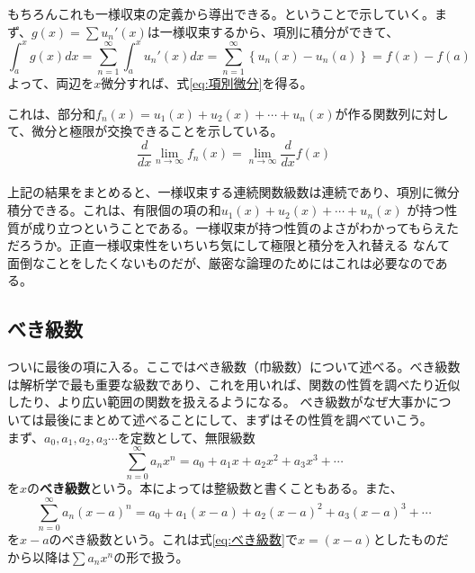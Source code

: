 \documentclass[a4j,dvipdfmx]{jsarticle}
\begin{document}
                もちろんこれも一様収束の定義から導出できる。ということで示していく。まず、$g(x)=\sum u_n'(x)$は一様収束するから、項別に積分ができて、
                \begin{equation*}
                    \int_{a}^{x}g(x)dx = \sum_{n=1}^{\infty}\int_{a}^{x}u_n'(x)dx = \sum_{n=1}^{\infty}\left\{u_n(x)-u_n(a)\right\}=f(x)-f(a)
                \end{equation*}
                よって、両辺を$x$微分すれば、式\eqref{eq:項別微分}を得る。

                これは、部分和$f_n(x)=u_1(x)+u_2(x)+\cdots+u_n(x)$が作る関数列に対して、微分と極限が交換できることを示している。
                \begin{equation*}
                    \frac{d}{dx}\lim_{n\to\infty}f_n(x)=\lim_{n\to\infty}\frac{d}{dx}f(x)
                \end{equation*}\\

                上記の結果をまとめると、一様収束する連続関数級数は連続であり、項別に微分積分できる。これは、有限個の項の和$u_1(x)+u_2(x)+\cdots+u_n(x)$
                が持つ性質が成り立つということである。一様収束が持つ性質のよさがわかってもらえただろうか。正直一様収束性をいちいち気にして極限と積分を入れ替える
                なんて面倒なことをしたくないものだが、厳密な論理のためにはこれは必要なのである。
            \clearpage
            \subsection{べき級数}
                ついに最後の項に入る。ここではべき級数（巾級数）について述べる。べき級数は解析学で最も重要な級数であり、これを用いれば、関数の性質を調べたり近似したり、より広い範囲の関数を扱えるようになる。
                べき級数がなぜ大事かについては最後にまとめて述べることにして、まずはその性質を調べていこう。\\

                まず、$a_0,a_1,a_2,a_3\cdots$を定数として、無限級数
                \begin{equation}
                    \sum_{n=0}^{\infty}a_n x^n =a_0+a_1x+a_2x^2+a_3x^3+\cdots\label{eq:べき級数}
                \end{equation}
                を$x$の\textbf{べき級数}という。本によっては整級数と書くこともある。また、
                \begin{equation}
                    \sum_{n=0}^{\infty}a_n (x-a)^n =a_0+a_1(x-a)+a_2(x-a)^2+a_3(x-a)^3+\cdots
                \end{equation}
                を$x-a$のべき級数という。これは式\eqref{eq:べき級数}で$x=(x-a)$としたものだから以降は$\sum a_nx^n$の形で扱う。
\end{document}
